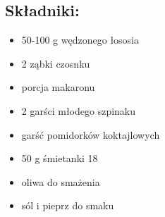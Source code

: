 \documentclass[a4paper,10pt]{book}
\begin{document}
\begin{multicols}{2}

\section*{Składniki:} \begin{itemize} 
\item 50-100 g wędzonego łososia 
\item 2 ząbki czosnku 
\item porcja makaronu 
\item 2 garści młodego szpinaku
\item garść pomidorków koktajlowych
\item 50 g śmietanki 18%
\item oliwa do smażenia 
\item sól i pieprz do smaku
\end{itemize}

\columnbreak

\begin{figure}[H]
    \centering
\end{figure}
\end{multicols}

\vspace{0.5cm} 
\end{document}
